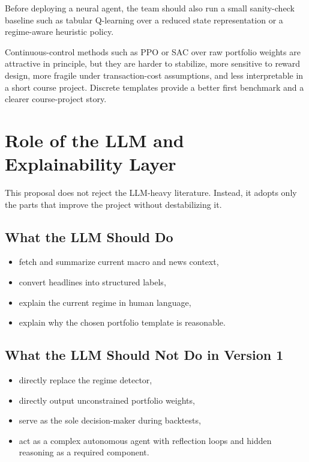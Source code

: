 \documentclass[11pt,a4paper]{article}
\begin{document}
Before deploying a neural agent, the team should also run a small sanity-check baseline such as tabular Q-learning over a reduced state representation or a regime-aware heuristic policy.

\begin{warningbox}[title=\textbf{Why Continuous Weights Are Not the First Target}]
Continuous-control methods such as PPO or SAC over raw portfolio weights are attractive in principle, but they are harder to stabilize, more sensitive to reward design, more fragile under transaction-cost assumptions, and less interpretable in a short course project.
Discrete templates provide a better first benchmark and a clearer course-project story.
\end{warningbox}

\section{Role of the LLM and Explainability Layer}

This proposal does not reject the LLM-heavy literature.
Instead, it adopts only the parts that improve the project without destabilizing it.

\subsection{What the LLM Should Do}

\begin{itemize}[leftmargin=1.4em]
  \item fetch and summarize current macro and news context,
  \item convert headlines into structured labels,
  \item explain the current regime in human language,
  \item explain why the chosen portfolio template is reasonable.
\end{itemize}

\subsection{What the LLM Should Not Do in Version 1}

\begin{itemize}[leftmargin=1.4em]
  \item directly replace the regime detector,
  \item directly output unconstrained portfolio weights,
  \item serve as the sole decision-maker during backtests,
  \item act as a complex autonomous agent with reflection loops and hidden reasoning as a required component.
\end{itemize}
\end{document}
